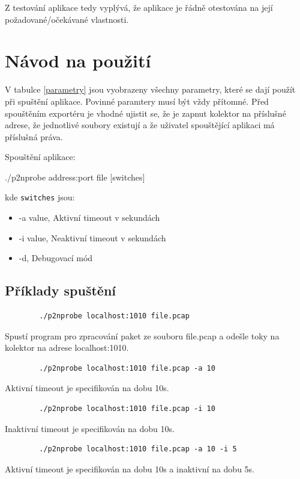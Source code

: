 \documentclass[11pt, a4paper, hidelinks]{article}[08.10.2023]
\begin{document}
    Z testování aplikace tedy vyplývá, že aplikace je řádně otestována na její požadované/očekávané vlastnosti.
    \section{Návod na použití}
    V tabulce \ref{parametry} jsou vyobrazeny všechny parametry, které se dají použít při spuštění aplikace. Povinné paramtery musí být vždy přítomné. Před spouštěním exportéru je vhodné ujistit se, že je zapnut kolektor na příslušné adrese, že jednotlivé soubory existují a že uživatel spouštějící aplikaci má příslušná práva. 
    
    Spouštění aplikace:

    \begin{center}
            ./p2nprobe address:port file [switches]
    \end{center}

    kde \texttt{switches} jsou:
    \begin{itemize}
        \item{-a value, Aktivní timeout v sekundách}
        \item{-i value, Neaktivní timeout v sekundách}
        \item{-d, Debugovací mód}
    \end{itemize}

    \subsection{Příklady spuštění}
    \begin{lstlisting}
        ./p2nprobe localhost:1010 file.pcap
    \end{lstlisting}
    Spustí program pro zpracování paket ze souboru file.pcap a odešle toky na kolektor na adrese localhost:1010.

    \begin{lstlisting}
        ./p2nprobe localhost:1010 file.pcap -a 10
    \end{lstlisting}
    Aktivní timeout je specifikován na dobu 10s.
    
    \begin{lstlisting}
        ./p2nprobe localhost:1010 file.pcap -i 10
    \end{lstlisting} 
    Inaktivní timeout je specifikován na dobu 10s.

    \begin{lstlisting}
        ./p2nprobe localhost:1010 file.pcap -a 10 -i 5
    \end{lstlisting}
    Aktivní timeout je specifikován na dobu 10s a inaktivní na dobu 5s.
\end{document}
